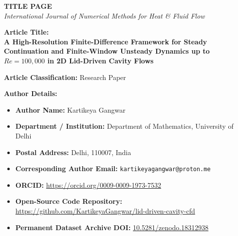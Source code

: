 \documentclass[11pt]{article}
\begin{document}
\begin{center}
    {\Large \textbf{TITLE PAGE}} \\[0.5em]
    {\large \textit{International Journal of Numerical Methods for Heat \& Fluid Flow}}
\end{center}

\vspace{1.5em}

\noindent\textbf{Article Title:} \\
{\Large \textbf{A High-Resolution Finite-Difference Framework for Steady Continuation and Finite-Window Unsteady Dynamics up to $Re = 100{,}000$ in 2D Lid-Driven Cavity Flows}}

\vspace{1.5em}

\noindent\textbf{Article Classification:} Research Paper

\vspace{1.5em}

\noindent\textbf{Author Details:}
\begin{itemize}
    \item \textbf{Author Name:} Kartikeya Gangwar
    \item \textbf{Department / Institution:} Department of Mathematics, University of Delhi
    \item \textbf{Postal Address:} Delhi, 110007, India
    \item \textbf{Corresponding Author Email:} \texttt{kartikeyagangwar@proton.me}
    \item \textbf{ORCID:} \url{https://orcid.org/0009-0009-1973-7532}
    \item \textbf{Open-Source Code Repository:} \url{https://github.com/KartikeyaGangwar/lid-driven-cavity-cfd}
    \item \textbf{Permanent Dataset Archive DOI:} \href{https://doi.org/10.5281/zenodo.18312938}{10.5281/zenodo.18312938}
\end{itemize}

\vspace{1em}
\end{document}
